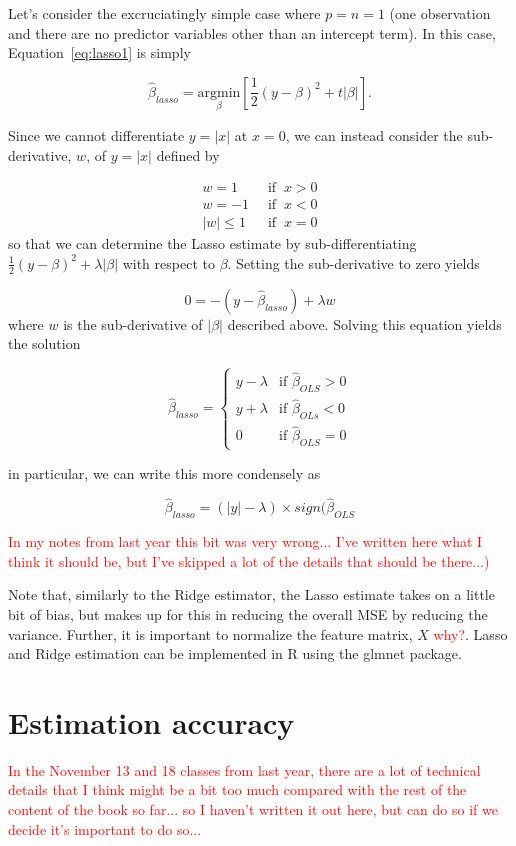 Let's consider the excruciatingly simple case where $p = n = 1$ (one observation and there are no predictor variables other than an intercept term). In this case, Equation~\ref{eq:lasso1} is simply 

$$\hat{\beta}_{lasso} = \underset{\beta}{\text{argmin}} \left[ \frac12 ( y -  \beta )^2 + t |\beta | \right].$$


Since we cannot differentiate $y = |x|$ at $x = 0$, we can instead consider the sub-derivative, $w$, of $y = |x|$ defined by

\begin{align*} 
w = 1 & ~\text{ if }~ x > 0 \\
w = -1 & ~\text{ if }~ x < 0\\
|w| \leq 1 & ~\text{ if }~ x = 0 
\end{align*}
so that we can determine the Lasso estimate by sub-differentiating $\frac12(y - \beta)^2 + \lambda | \beta|$ with respect to $\beta$. Setting the sub-derivative to zero yields

$$ 0 = - (y - \hat{\beta}_{lasso}) + \lambda w$$
where $w$ is the sub-derivative of $|\beta|$ described above. Solving this equation yields the solution

$$\hat{\beta}_{lasso} = \begin{cases} y - \lambda & \text{if } \hat{\beta}_{OLS} > 0\\
y + \lambda & \text{if } \hat{\beta}_{OLs} < 0\\
0 & \text{if } \hat{\beta}_{OLS} = 0
\end{cases}$$


in particular, we can write this more condensely as

$$\hat{\beta}_{lasso} = (|y| - \lambda) \times  sign(\hat{\beta}_{OLS}$$

\textcolor{red}{In my notes from last year this bit was very wrong... I've written here what I think it should be, but I've skipped a lot of the details that should be there...)}



Note that, similarly to the Ridge estimator, the Lasso estimate takes on a little bit of bias, but makes up for this in reducing the overall MSE by reducing the variance. Further, it is important to normalize the feature matrix, $X$ \textcolor{red}{why?}. Lasso and Ridge estimation can be implemented in R using the glmnet package.


\section{Estimation accuracy}

\textcolor{red}{In the November 13 and 18 classes from last year, there are a lot of technical details that I think might be a bit too much compared with the rest of the content of the book so far... so I haven't written it out here, but can do so if we decide it's important to do so...}